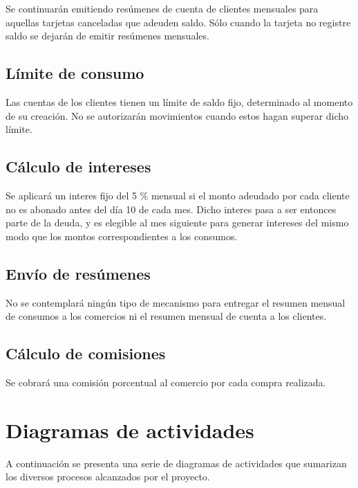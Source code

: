 Se continuarán emitiendo resúmenes de cuenta de clientes mensuales para aquellas tarjetas canceladas que adeuden saldo. Sólo cuando la tarjeta no registre saldo se dejarán de emitir resúmenes mensuales.

\subsection{Límite de consumo}

Las cuentas de los clientes tienen un límite de saldo fijo, determinado al momento de su creación. No se autorizarán movimientos cuando estos hagan superar dicho límite.

\subsection{Cálculo de intereses}

Se aplicará un interes fijo del 5 \% mensual si el monto adeudado por cada cliente no es abonado antes del día 10 de cada mes. Dicho interes pasa a ser entonces parte de la deuda, y es elegible al mes siguiente para generar intereses del mismo modo que los montos correspondientes a los consumos.

\subsection{Envío de resúmenes}

No se contemplará ningún tipo de mecanismo para entregar el resumen mensual de consumos a los comercios ni el resumen mensual de cuenta a los clientes.

\subsection{Cálculo de comisiones}

Se cobrará una comisión porcentual al comercio por cada compra realizada.

\section{Diagramas de actividades}

A continuación se presenta una serie de diagramas de actividades que sumarizan los diversos procesos alcanzados por el proyecto.

